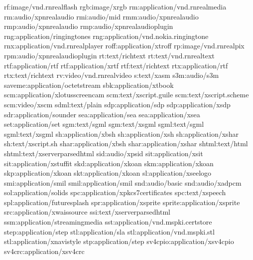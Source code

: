 \documentclass[letterpaper,12pt,english]{sphinxmanual}
\begin{document}
\begin{sphinxVerbatim}[commandchars=\\\{\}]
\PYGZsh{}rf:image/vnd.rn\PYGZhy{}realflash
rgb:image/x\PYGZhy{}rgb
rm:application/vnd.rn\PYGZhy{}realmedia
\PYGZsh{}rm:audio/x\PYGZhy{}pn\PYGZhy{}realaudio
rmi:audio/mid
rmm:audio/x\PYGZhy{}pn\PYGZhy{}realaudio
rmp:audio/x\PYGZhy{}pn\PYGZhy{}realaudio
\PYGZsh{}rmp:audio/x\PYGZhy{}pn\PYGZhy{}realaudio\PYGZhy{}plugin
rng:application/ringing\PYGZhy{}tones
\PYGZsh{}rng:application/vnd.nokia.ringing\PYGZhy{}tone
rnx:application/vnd.rn\PYGZhy{}realplayer
roff:application/x\PYGZhy{}troff
rp:image/vnd.rn\PYGZhy{}realpix
rpm:audio/x\PYGZhy{}pn\PYGZhy{}realaudio\PYGZhy{}plugin
rt:text/richtext
\PYGZsh{}rt:text/vnd.rn\PYGZhy{}realtext
rtf:application/rtf
\PYGZsh{}rtf:application/x\PYGZhy{}rtf
\PYGZsh{}rtf:text/richtext
\PYGZsh{}rtx:application/rtf
\PYGZsh{}rtx:text/richtext
rv:video/vnd.rn\PYGZhy{}realvideo
s:text/x\PYGZhy{}asm
s3m:audio/s3m
\PYGZsh{}saveme:application/octet\PYGZhy{}stream
sbk:application/x\PYGZhy{}tbook
scm:application/x\PYGZhy{}lotusscreencam
\PYGZsh{}scm:text/x\PYGZhy{}script.guile
\PYGZsh{}scm:text/x\PYGZhy{}script.scheme
\PYGZsh{}scm:video/x\PYGZhy{}scm
sdml:text/plain
sdp:application/sdp
\PYGZsh{}sdp:application/x\PYGZhy{}sdp
sdr:application/sounder
sea:application/sea
\PYGZsh{}sea:application/x\PYGZhy{}sea
set:application/set
sgm:text/sgml
\PYGZsh{}sgm:text/x\PYGZhy{}sgml
sgml:text/sgml
\PYGZsh{}sgml:text/x\PYGZhy{}sgml
sh:application/x\PYGZhy{}bsh
\PYGZsh{}sh:application/x\PYGZhy{}sh
\PYGZsh{}sh:application/x\PYGZhy{}shar
\PYGZsh{}sh:text/x\PYGZhy{}script.sh
shar:application/x\PYGZhy{}bsh
\PYGZsh{}shar:application/x\PYGZhy{}shar
shtml:text/html
\PYGZsh{}shtml:text/x\PYGZhy{}server\PYGZhy{}parsed\PYGZhy{}html
sid:audio/x\PYGZhy{}psid
\PYGZsh{}sit:application/x\PYGZhy{}sit
sit:application/x\PYGZhy{}stuffit
skd:application/x\PYGZhy{}koan
skm:application/x\PYGZhy{}koan
skp:application/x\PYGZhy{}koan
skt:application/x\PYGZhy{}koan
sl:application/x\PYGZhy{}seelogo
smi:application/smil
smil:application/smil
\PYGZsh{}snd:audio/basic
snd:audio/x\PYGZhy{}adpcm
sol:application/solids
\PYGZsh{}spc:application/x\PYGZhy{}pkcs7\PYGZhy{}certificates
spc:text/x\PYGZhy{}speech
spl:application/futuresplash
spr:application/x\PYGZhy{}sprite
sprite:application/x\PYGZhy{}sprite
src:application/x\PYGZhy{}wais\PYGZhy{}source
ssi:text/x\PYGZhy{}server\PYGZhy{}parsed\PYGZhy{}html
ssm:application/streamingmedia
sst:application/vnd.ms\PYGZhy{}pki.certstore
step:application/step
stl:application/sla
\PYGZsh{}stl:application/vnd.ms\PYGZhy{}pki.stl
\PYGZsh{}stl:application/x\PYGZhy{}navistyle
stp:application/step
sv4cpio:application/x\PYGZhy{}sv4cpio
sv4crc:application/x\PYGZhy{}sv4crc

\end{sphinxVerbatim}
\end{document}
